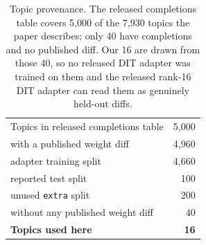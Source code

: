 \begin{table}[htbp]
\centering
\begin{tabular}{lr}
\toprule
Topics in released completions table             & 5{,}000 \\
\quad with a published weight diff               & 4{,}960 \\
\quad\quad adapter training split                & 4{,}660 \\
\quad\quad reported test split                   & 100 \\
\quad\quad unused \texttt{extra} split           & 200 \\
\quad without any published weight diff          & 40 \\
\midrule
\textbf{Topics used here}                        & \textbf{16} \\
\bottomrule
\end{tabular}
\caption{Topic provenance. The released completions table covers 5{,}000 of the 7{,}930 topics
the paper describes; only 40 have completions and no published diff. Our 16 are drawn from those
40, so no released DIT adapter was trained on them and the released rank-16 DIT adapter can read
them as genuinely held-out diffs.}
\label{tab:dit-provenance}
\end{table}

